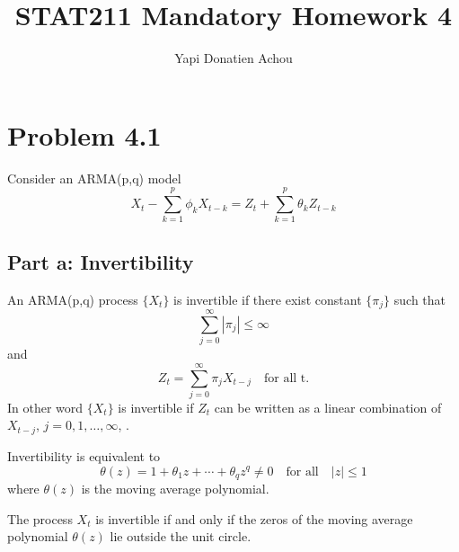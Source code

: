 \documentclass[11pt, oneside]{article}   	%
\title{STAT211 Mandatory Homework 4}
\author{Yapi Donatien Achou}
\begin{document}
\maketitle
\tableofcontents
\newpage
 
\section{Problem 4.1}
Consider an ARMA(p,q) model 
\begin{equation}\label{eq:arma}
X_{t}-\sum_{k=1}^{p}\phi_{k}X_{t-k} = Z_{t}+\sum_{k=1}^{p}\theta_{k}Z_{t-k}
\end{equation}
\subsection{Part a: Invertibility}
An ARMA(p,q) process $\{  X_{t}\}$ is invertible if there exist constant $\{  \pi_{j}\}$ such that 
\begin{equation}
\sum_{j=0}^{\infty}|\pi_{j}| \le \infty
\end{equation}
and 
\begin{equation}\label{eq:z}
Z_{t} = \sum_{j=0}^{\infty}\pi_{j}X_{t-j} \quad \text{for all t}.
\end{equation}
In other word $\{  X_{t}\}$ is invertible if $Z_{t}$ can be written as a linear combination of $X_{t-j}$, $j = 0,1, \dots, \infty$, \cite{petter}.

\begin{flushleft}
Invertibility is equivalent to 
\begin{equation}\label{eq:theta}
\theta(z) = 1+ \theta_{1}z+ \cdots + \theta_{q}z^{q}\neq 0 \quad \text{for all} \quad |z| \leq 1
\end{equation}
where $\theta(z)$ is the moving average polynomial.
\end{flushleft}

\begin{flushleft}
The process $X_{t}$ is invertible if and only if the zeros of the moving average polynomial $\theta(z)$ lie outside the unit circle.
\end{flushleft}
\end{document}
